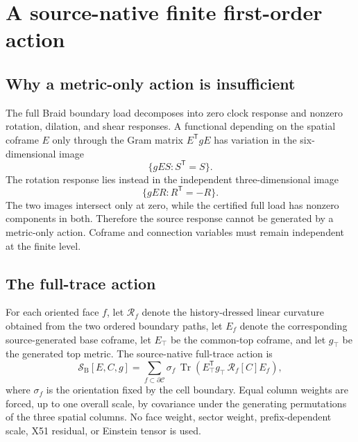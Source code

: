 \documentclass[11pt]{article}
\theoremstyle{definition}
\theoremstyle{remark}
\newcommand{\Tr}{\operatorname{Tr}}
\begin{document}
\section{A source-native finite first-order action}

\subsection{Why a metric-only action is insufficient}

The full Braid boundary load decomposes into zero clock response and nonzero rotation, dilation, and shear responses. A functional depending on the spatial coframe $E$ only through the Gram matrix $E^{\mathsf T}gE$ has variation in the six-dimensional image
\begin{equation}\label{eq:metricimage}
 \{gES:S^{\mathsf T}=S\}.
\end{equation}
The rotation response lies instead in the independent three-dimensional image
\begin{equation}\label{eq:rotationimage}
 \{gER:R^{\mathsf T}=-R\}.
\end{equation}
The two images intersect only at zero, while the certified full load has nonzero components in both. Therefore the source response cannot be generated by a metric-only action. Coframe and connection variables must remain independent at the finite level.

\subsection{The full-trace action}

For each oriented face $f$, let $\mathcal R_f$ denote the history-dressed linear curvature obtained from the two ordered boundary paths, let $E_f$ denote the corresponding source-generated base coframe, let $E_\top$ be the common-top coframe, and let $g_\top$ be the generated top metric. The source-native full-trace action is
\begin{equation}\label{eq:fullaction}
 \mathcal S_{\mathrm{B}}[E,C,g]
 =\sum_{f\subset\partial\mathcal C}
 \sigma_f\,\Tr\!\left(E_\top^{\mathsf T}g_\top\,\mathcal R_f[C]E_f\right),
\end{equation}
where $\sigma_f$ is the orientation fixed by the cell boundary. Equal column weights are forced, up to one overall scale, by covariance under the generating permutations of the three spatial columns. No face weight, sector weight, prefix-dependent scale, X51 residual, or Einstein tensor is used.
\end{document}
